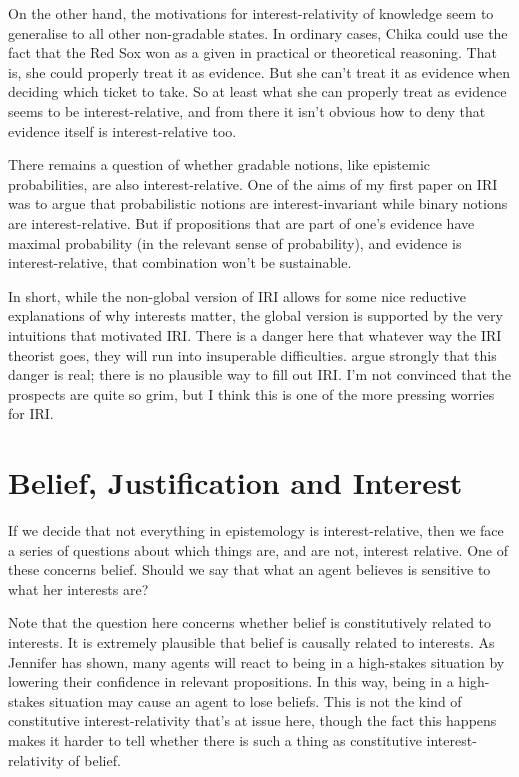 \documentclass[11pt,oneside]{book}
\begin{document}
On the other hand, the motivations for interest-relativity of knowledge seem to generalise to all other non-gradable states. In ordinary cases, Chika could use the fact that the Red Sox won as a given in practical or theoretical reasoning. That is, she could properly treat it as evidence. But she can't treat it as evidence when deciding which ticket to take. So at least what she can properly treat as evidence seems to be interest-relative, and from there it isn't obvious how to deny that evidence itself is interest-relative too.

There remains a question of whether gradable notions, like epistemic probabilities, are also interest-relative. One of the aims of my first paper on IRI ~\citep{Weatherson2005} was to argue that probabilistic notions are interest-invariant while binary notions are interest-relative. But if propositions that are part of one's evidence have maximal probability (in the relevant sense of probability), and evidence is interest-relative, that combination won't be sustainable. 

In short, while the non-global version of IRI allows for some nice reductive explanations of why interests matter, the global version is supported by the very intuitions that motivated IRI. There is a danger here that whatever way the IRI theorist goes, they will run into insuperable difficulties.  \citet{IchikawaEtAl2012} argue strongly that this danger is real; there is no plausible way to fill out IRI. I'm not convinced that the prospects are quite so grim, but I think this is one of the more pressing worries for IRI.

\section{Belief, Justification and Interest}
\label{beliefjustificationandinterest}

If we decide that not everything in epistemology is interest-relative, then we face a series of questions about which things are, and are not, interest relative. One of these concerns belief. Should we say that what an agent believes is sensitive to what her interests are?

Note that the question here concerns whether belief is constitutively related to interests. It is extremely plausible that belief is causally related to interests. As Jennifer  \citet{Nagel2008} has shown, many agents will react to being in a high-stakes situation by lowering their confidence in relevant propositions. In this way, being in a high-stakes situation may cause an agent to lose beliefs. This is not the kind of constitutive interest-relativity that's at issue here, though the fact this happens makes it harder to tell whether there is such a thing as constitutive interest-relativity of belief.
\end{document}
